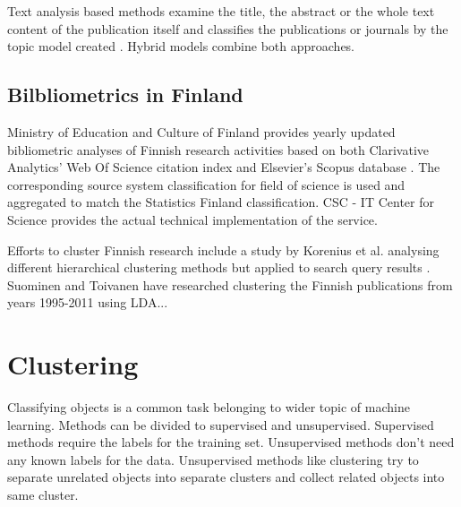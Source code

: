 Text analysis based methods examine the title, the abstract or 
the whole text content of the publication itself and classifies 
the publications or journals by the topic model created 
\cite{blei_latent_2003}.
Hybrid models combine both approaches.





\subsection{Bilbliometrics in Finland}
Ministry of Education and Culture of Finland provides yearly 
updated bibliometric analyses of Finnish research activities 
based on both Clarivative Analytics' Web Of Science citation 
index \cite[Vipunen service]{noauthor_ministry_2019} 
and Elsevier's Scopus database \cite[Vipunen 
service]{noauthor_ministry_2019-1}. The corresponding source 
system classification for field of science is used and 
aggregated to match the Statistics Finland classification. CSC - 
IT Center for Science provides the actual technical implementation 
of the service. 

Efforts to cluster Finnish research include a study by Korenius 
et al. analysing different hierarchical clustering methods but
applied to search query results \cite{korenius_hierarchical_2006}.
Suominen and Toivanen have researched clustering the Finnish
publications from years 1995-2011 using LDA... 
\cite{suominen_map_2016} 


\section{Clustering}
Classifying objects is a common task belonging to wider topic of 
machine learning. Methods can be divided to supervised and 
unsupervised. Supervised methods require the labels for the training
set. Unsupervised methods don't need any known labels for the data.
Unsupervised methods like clustering try to separate unrelated objects
into separate clusters and collect related objects into same cluster.

